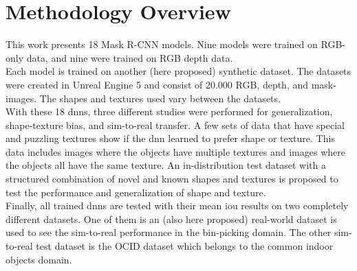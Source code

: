 	\section{Methodology Overview}
	\label{sec:methodology-overview}
		This work presents 18 Mask R-CNN \cite{Kaiming2017} models. Nine models were trained on RGB-only data, and nine were trained on RGB depth data.\\
		Each model is trained on another (here proposed) synthetic dataset. The datasets were created in Unreal Engine 5 \cite{Romero2022} and consist of 20.000 RGB, depth, and mask-images. The shapes and textures used vary between the datasets.\\ 
		With these 18 \ac{dnn}s, three different studies were performed for generalization, shape-texture bias, and sim-to-real transfer. A few sets of data that have special and puzzling textures show if the \ac{dnn} learned to prefer shape or texture. This data includes images where the objects have multiple textures and images where the objects all have the same texture. An in-distribution test dataset with a structured combination of novel and known shapes and textures is proposed to test the performance and generalization of shape and texture.\\
		Finally, all trained \ac{dnn}s are tested with their mean \ac{iou} results on two completely different datasets. One of them is an (also here proposed) real-world dataset is used to see the sim-to-real performance in the bin-picking domain. The other sim-to-real test dataset is the OCID dataset \cite{Suchi2019} which belongs to the common indoor objects domain. 
		
	
	
